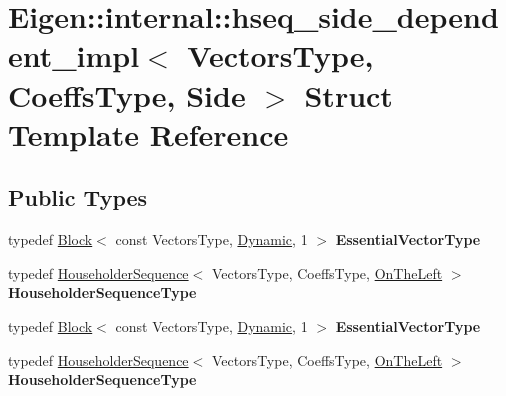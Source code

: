 \hypertarget{struct_eigen_1_1internal_1_1hseq__side__dependent__impl}{}\section{Eigen\+:\+:internal\+:\+:hseq\+\_\+side\+\_\+dependent\+\_\+impl$<$ Vectors\+Type, Coeffs\+Type, Side $>$ Struct Template Reference}
\label{struct_eigen_1_1internal_1_1hseq__side__dependent__impl}
\subsection*{Public Types}
\begin{DoxyCompactItemize}
\item 
\mbox{\label{struct_eigen_1_1internal_1_1hseq__side__dependent__impl_a51185d5e14356717e56f76af9242c8d0}} 
typedef \hyperlink{group___core___module_class_eigen_1_1_block}{Block}$<$ const Vectors\+Type, \hyperlink{namespace_eigen_ad81fa7195215a0ce30017dfac309f0b2}{Dynamic}, 1 $>$ {\bfseries Essential\+Vector\+Type}
\item 
\mbox{\label{struct_eigen_1_1internal_1_1hseq__side__dependent__impl_a17ce37940408090919613afeaa81617a}} 
typedef \hyperlink{group___householder___module_class_eigen_1_1_householder_sequence}{Householder\+Sequence}$<$ Vectors\+Type, Coeffs\+Type, \hyperlink{group__enums_ggac22de43beeac7a78b384f99bed5cee0ba129609b3bdf23b071f5f86cf2f995ec4}{On\+The\+Left} $>$ {\bfseries Householder\+Sequence\+Type}
\item 
\mbox{\label{struct_eigen_1_1internal_1_1hseq__side__dependent__impl_a51185d5e14356717e56f76af9242c8d0}} 
typedef \hyperlink{group___core___module_class_eigen_1_1_block}{Block}$<$ const Vectors\+Type, \hyperlink{namespace_eigen_ad81fa7195215a0ce30017dfac309f0b2}{Dynamic}, 1 $>$ {\bfseries Essential\+Vector\+Type}
\item 
\mbox{\label{struct_eigen_1_1internal_1_1hseq__side__dependent__impl_a17ce37940408090919613afeaa81617a}} 
typedef \hyperlink{group___householder___module_class_eigen_1_1_householder_sequence}{Householder\+Sequence}$<$ Vectors\+Type, Coeffs\+Type, \hyperlink{group__enums_ggac22de43beeac7a78b384f99bed5cee0ba129609b3bdf23b071f5f86cf2f995ec4}{On\+The\+Left} $>$ {\bfseries Householder\+Sequence\+Type}
\end{DoxyCompactItemize}
